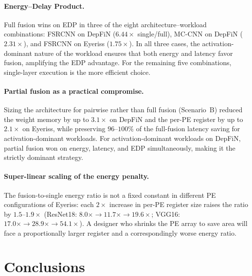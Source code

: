 \documentclass[11pt,a4paper,twocolumn]{article}
\begin{document}
\paragraph{Energy--Delay Product.}
Full fusion wins on EDP in three of the eight architecture--workload
combinations: FSRCNN on DepFiN ($6.44\times$ single/full), MC-CNN
on DepFiN ($2.31\times$), and FSRCNN on Eyeriss ($1.75\times$).
In all three cases, the activation-dominant nature of the workload
ensures that both energy and latency favor fusion, amplifying the
EDP advantage.
For the remaining five combinations, single-layer execution is the
more efficient choice.

\paragraph{Partial fusion as a practical compromise.}
Sizing the architecture for pairwise rather than full fusion
(Scenario~B) reduced the weight memory by up to $3.1\times$ on
DepFiN and the per-PE register by up to $2.1\times$ on Eyeriss,
while preserving $96$--$100\%$ of the full-fusion latency saving
for activation-dominant workloads.
For activation-dominant workloads on DepFiN, partial fusion won on
energy, latency, and EDP simultaneously, making it the strictly
dominant strategy.

\paragraph{Super-linear scaling of the energy penalty.}
The fusion-to-single energy ratio is not a fixed constant in different PE configurations of Eyeriss:
each $2\times$ increase in per-PE register size raises the ratio by
$1.5$--$1.9\times$ (ResNet18: $8.0\times \to 11.7\times \to
19.6\times$; VGG16: $17.0\times \to 28.9\times \to 54.1\times$).
A designer who shrinks the PE array to save area will face a
proportionally larger register and a correspondingly worse energy
ratio.


\section*{Conclusions}
\end{document}

